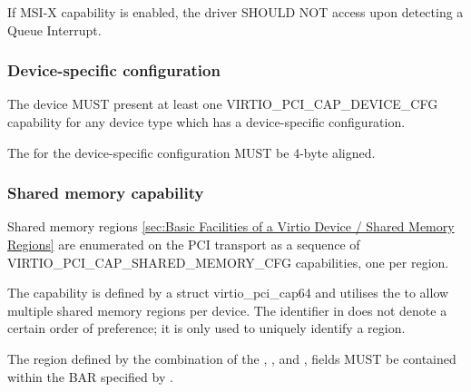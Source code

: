 If MSI-X capability is enabled, the driver SHOULD NOT access
 upon detecting a Queue Interrupt.

\subsubsection{Device-specific configuration}\label{sec:Virtio Transport Options / Virtio Over PCI Bus / PCI Device Layout / Device-specific configuration}

The device MUST present at least one VIRTIO_PCI_CAP_DEVICE_CFG capability for
any device type which has a device-specific configuration.


The  for the device-specific configuration MUST be 4-byte aligned.

\subsubsection{Shared memory capability}\label{sec:Virtio Transport Options / Virtio Over PCI Bus / PCI Device Layout / Shared memory capability}

Shared memory regions \ref{sec:Basic Facilities of a Virtio
Device / Shared Memory Regions} are enumerated on the PCI transport
as a sequence of VIRTIO_PCI_CAP_SHARED_MEMORY_CFG capabilities, one per region.

The capability is defined by a struct virtio_pci_cap64 and
utilises the  to allow multiple shared memory
regions per device.
The identifier in  does not denote a certain order of
preference; it is only used to uniquely identify a region.


The region defined by the combination of the ,
, and , 
fields MUST be contained within the BAR specified by
.

